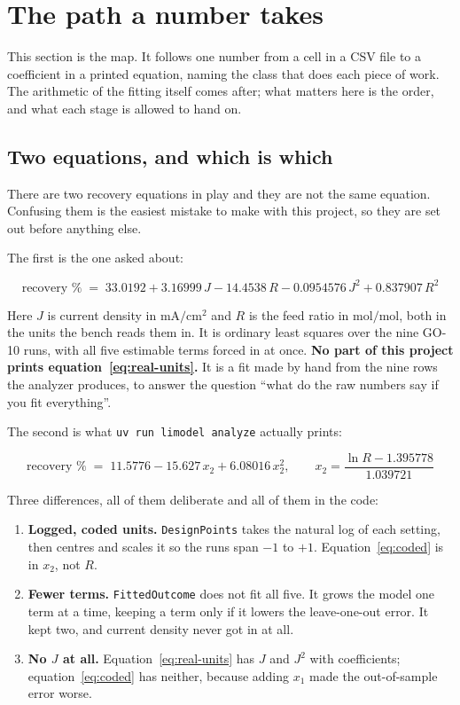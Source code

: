 \section{The path a number takes}

This section is the map. It follows one number from a cell in a CSV file to a coefficient in
a printed equation, naming the class that does each piece of work. The arithmetic of the
fitting itself comes after; what matters here is the order, and what each stage is allowed
to hand on.

\subsection{Two equations, and which is which}

There are two recovery equations in play and they are not the same equation. Confusing them
is the easiest mistake to make with this project, so they are set out before anything else.

The first is the one asked about:

\begin{equation}
\label{eq:real-units}
\text{recovery \%} \;=\; 33.0192 + 3.16999\,J - 14.4538\,R - 0.0954576\,J^{2}
+ 0.837907\,R^{2}
\end{equation}

Here $J$ is current density in $\mathrm{mA/cm^2}$ and $R$ is the feed ratio in
$\mathrm{mol/mol}$, both in the units the bench reads them in. It is ordinary least squares
over the nine GO-10 runs, with all five estimable terms forced in at once. \textbf{No part of
this project prints equation~\ref{eq:real-units}.} It is a fit made by hand from the nine
rows the analyzer produces, to answer the question ``what do the raw numbers say if you fit
everything''.

The second is what \texttt{uv run limodel analyze} actually prints:

\begin{equation}
\label{eq:coded}
\text{recovery \%} \;=\; 11.5776 - 15.627\,x_2 + 6.08016\,x_2^{2},
\qquad
x_2 = \frac{\ln R - 1.395778}{1.039721}
\end{equation}

Three differences, all of them deliberate and all of them in the code:

\begin{enumerate}[nosep]
  \item \textbf{Logged, coded units.} \texttt{DesignPoints} takes the natural log of each
        setting, then centres and scales it so the runs span $-1$ to $+1$. Equation~\ref{eq:coded}
        is in $x_2$, not $R$.
  \item \textbf{Fewer terms.} \texttt{FittedOutcome} does not fit all five. It grows the model
        one term at a time, keeping a term only if it lowers the leave-one-out error. It kept
        two, and current density never got in at all.
  \item \textbf{No $J$ at all.} Equation~\ref{eq:real-units} has $J$ and $J^2$ with
        coefficients; equation~\ref{eq:coded} has neither, because adding $x_1$ made the
        out-of-sample error worse.
\end{enumerate}

